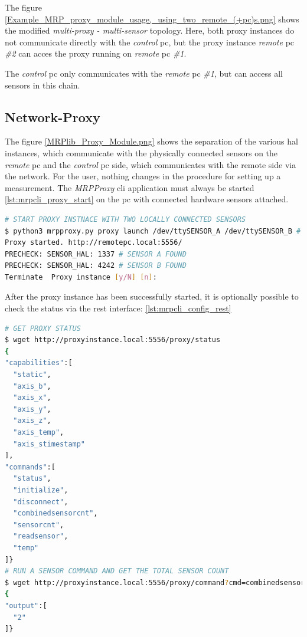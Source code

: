The figure
\ref{Example_MRP_proxy_module_usage,_using_two_remote_(+pc)s.png} shows
the modified \emph{multi-proxy - multi-sensor} topology. Here, both
proxy instances do not communicate directly with the \emph{control}
\gls{pc}, but the proxy instance \emph{remote} \gls{pc} \emph{\#2} can
acces the proxy running on \emph{remote} \gls{pc} \emph{\#1}.

The \emph{control} \gls{pc} only communicates with the \emph{remote}
\gls{pc} \emph{\#1}, but can access all sensors in this chain.

\hypertarget{network-proxy}{%
\subsection{Network-Proxy}\label{network-proxy}}

The figure \ref{MRPlib_Proxy_Module.png} shows the separation of the
various \gls{hal} instances, which communicate with the physically
connected sensors on the \emph{remote} \gls{pc} and the \emph{control}
\gls{pc} side, which communicates with the remote side via the network.
For the user, nothing changes in the procedure for setting up a
measurement. The \emph{MRPProxy} \gls{cli} application must always be
started \ref{lst:mrpcli_proxy_start} on the \gls{pc} with connected
hardware sensors attached.

\begin{lstlisting}[language=bash, caption={MRPproxy usage to enable local sensor usage over network}, label=lst:mrpcli_proxy_start]
# START PROXY INSTNACE WITH TWO LOCALLY CONNECTED SENSORS
$ python3 mrpproxy.py proxy launch /dev/ttySENSOR_A /dev/ttySENSOR_B # add another proxy instance http://proxyinstance_2.local for multi-sensor, multi-proxy chain
Proxy started. http://remotepc.local:5556/
PRECHECK: SENSOR_HAL: 1337 # SENSOR A FOUND
PRECHECK: SENSOR_HAL: 4242 # SENSOR B FOUND
Terminate  Proxy instance [y/N] [n]: 
\end{lstlisting}

After the proxy instance has been successfully started, it is optionally
possible to check the status via the \gls{rest} interface:
\ref{lst:mrpcli_config_rest}

\begin{lstlisting}[language=bash, caption={MRPProxy REST endpoint query examples}, label=lst:mrpcli_config_rest]
# GET PROXY STATUS
$ wget http://proxyinstance.local:5556/proxy/status
{
"capabilities":[
  "static",
  "axis_b",
  "axis_x",
  "axis_y",
  "axis_z",
  "axis_temp",
  "axis_stimestamp"
],
"commands":[
  "status",
  "initialize",
  "disconnect",
  "combinedsensorcnt",
  "sensorcnt",
  "readsensor",
  "temp"
]}
# RUN A SENSOR COMMAND AND GET THE TOTAL SENSOR COUNT
$ wget http://proxyinstance.local:5556/proxy/command?cmd=combinedsensorcnt
{
"output":[
  "2"
]}
\end{lstlisting}

